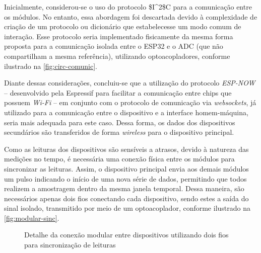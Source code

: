 Inicialmente, considerou-se o uso do protocolo \gls{$I^2$C} para a comunicação entre os módulos. No entanto, essa abordagem foi descartada devido à complexidade de criação de um protocolo ou dicionário que estabelecesse um modo comum de interação. Esse protocolo seria implementado fisicamente da mesma forma proposta para a comunicação isolada entre o ESP32 e o \gls{ADC} (que não compartilham a mesma referência), utilizando optoacopladores, conforme ilustrado na \autoref{fig:circ-comunic}.

Diante dessas considerações, concluiu-se que a utilização do protocolo \textit{ESP-NOW} – desenvolvido pela Espressif para facilitar a comunicação entre chips que possuem \textit{Wi-Fi} – em conjunto com o protocolo de comunicação via \textit{websockets}, já utilizado para a comunicação entre o dispositivo e a interface homem-máquina, seria mais adequada para este caso. Dessa forma, os dados dos dispositivos secundários são transferidos de forma \textit{wireless} para o dispositivo principal.

Como as leituras dos dispositivos são sensíveis a atrasos, devido à natureza das medições no tempo, é necessária uma conexão física entre os módulos para sincronizar as leituras. Assim, o dispositivo principal envia aos demais módulos um pulso indicando o início de uma nova série de dados, permitindo que todos realizem a amostragem dentro da mesma janela temporal. Dessa maneira, são necessários apenas dois fios conectando cada dispositivo, sendo estes a saída do sinal isolado, transmitido por meio de um optoacoplador, conforme ilustrado na \autoref{fig:modular-sinc}.

\begin{figure}[htb!]
    \caption{Detalhe da conexão modular entre dispositivos utilizando dois fios para sincronização de leituras}
    \vspace*{5mm}
    \label{fig:modular-sinc}
    \fonte{}
\end{figure}

